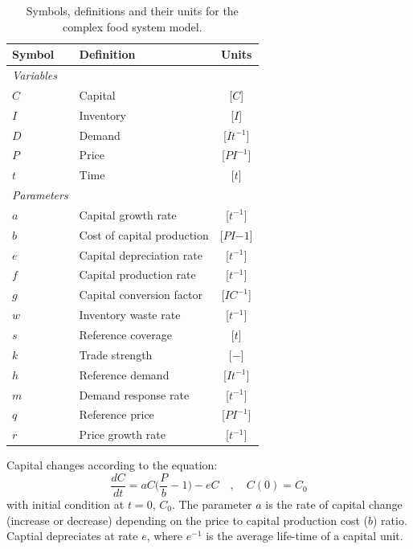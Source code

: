 \documentclass[9pt,twocolumn,twoside,lineno]{pnas-new}
\begin{document}
\begin{table}[t!]
  \centering
  \footnotesize
  \begin{tabular}{llc}
    \textbf{Symbol} & \textbf{Definition} & \textbf{Units} \\ 
    \midrule
    \textit{Variables} &&\\
    $C$    & Capital             & [$C$]\\
    $I$    & Inventory           & [$I$]\\
    $D$    & Demand              & [$It^{-1}$]\\
    $P$    & Price               & [$PI^{-1}$]\\
    $t$    & Time                & [$t$]\\
    \textit{Parameters} &&\\
    $a$    & Capital growth rate & [$t^{-1}$]\\
    $b$    & Cost of capital production & [$PI{-1}$]\\
    $e$    & Capital depreciation rate & [$t^{-1}$]\\
    $f$    & Capital production rate & [$t^{-1}$]\\
    $g$    & Capital conversion factor & [$IC^{-1}$]\\
    $w$    & Inventory waste rate     & [$t^{-1}$]\\
    $s$    & Reference coverage       & [$t$]\\
    $k$    & Trade strength        & [$-$]\\
    $h$    & Reference demand         & [$It^{-1}$]\\
    $m$    & Demand response rate     & [$t^{-1}$]\\
    $q$    & Reference price          & [$PI^{-1}$]\\
    $r$    & Price growth rate        & [$t^{-1}$]\\
    \bottomrule
  \end{tabular}
  \caption{Symbols, definitions and their units for the complex food system model.}
  \label{table:t_symbols}
\end{table}

Capital changes according to the equation:
%
\begin{equation}
  \frac{dC}{dt} = a C \Big(\frac{P}{b} - 1\Big) - e C \quad, \quad C(0) = C_0
  \label{eq_capital}
\end{equation}
%
with initial condition at $t = 0$, $C_0$. The parameter $a$ is the rate of capital change (increase or decrease) depending on the price to capital production cost ($b$) ratio. Captial depreciates at rate $e$, where $e^{-1}$ is the average life-time of a capital unit.
\end{document}
